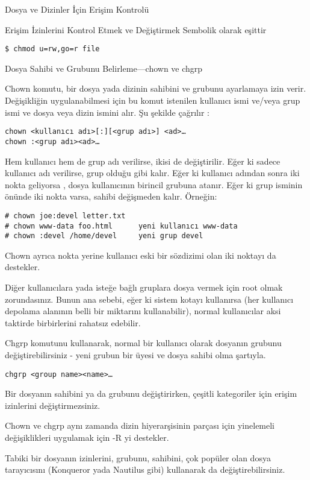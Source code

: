 \begin{section}{Dosya ve Dizinler İçin Erişim Kontrolü}
\begin{subsection}{Erişim İzinlerini Kontrol Etmek ve Değiştirmek}
Sembolik olarak eşittir
\begin{verbatim}
$ chmod u=rw,go=r file
\end{verbatim}
\end{subsection}
\begin{subsection}{Dosya Sahibi ve Grubunu Belirleme—chown ve chgrp}

Chown komutu, bir dosya yada dizinin sahibini ve grubunu ayarlamaya izin verir. Değişikliğin uygulanabilmesi için bu komut istenilen kullanıcı ismi ve/veya grup ismi ve dosya veya dizin ismini alır. Şu şekilde çağrılır :
\begin{verbatim}
chown <kullanıcı adı>[:][<grup adı>] <ad>…
chown :<grup adı><ad>…
\end{verbatim}

Hem kullanıcı hem de grup adı verilirse, ikisi de değiştirilir. Eğer ki sadece kullanıcı adı verilirse, grup olduğu gibi kalır. Eğer ki kullanıcı adından sonra iki nokta geliyorsa , dosya kullanıcının birincil grubuna atanır. Eğer ki grup isminin önünde iki nokta varsa, sahibi değişmeden kalır. Örneğin:
\begin{verbatim}
# chown joe:devel letter.txt
# chown www-data foo.html      yeni kullanıcı www-data
# chown :devel /home/devel     yeni grup devel
\end{verbatim}

Chown ayrıca nokta yerine kullanıcı eski bir sözdizimi olan iki noktayı da destekler.

Diğer kullanıcılara yada isteğe bağlı gruplara dosya vermek için root olmak zorundasınız. Bunun ana sebebi, eğer ki sistem kotayı kullanırsa (her kullanıcı depolama alanının belli bir miktarını kullanabilir), normal kullanıcılar aksi taktirde birbirlerini rahatsız edebilir.

Chgrp komutunu kullanarak, normal bir kullanıcı olarak dosyanın grubunu değiştirebilirsiniz - yeni grubun bir üyesi ve dosya sahibi olma şartıyla.
\begin{verbatim}
chgrp <group name><name>…
\end{verbatim}

Bir dosyanın sahibini ya da grubunu değiştirirken, çeşitli kategoriler için erişim izinlerini değiştirmezsiniz.

Chown ve chgrp aynı zamanda dizin hiyerarşisinin parçası için yinelemeli değişiklikleri uygulamak için -R yi destekler.

Tabiki bir dosyanın izinlerini, grubunu, sahibini, çok popüler olan dosya tarayıcısını (Konqueror yada Nautilus gibi) kullanarak da değiştirebilirsiniz.


\end{subsection}
\end{section}
